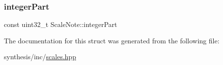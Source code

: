 \mbox{\label{struct_scale_note_aebbc5374b38420c4be5bd2ab0892d2c9}} 
\subsubsection{\texorpdfstring{integer\+Part}{integerPart}}
{\footnotesize\ttfamily const uint32\+\_\+t Scale\+Note\+::integer\+Part}



The documentation for this struct was generated from the following file\+:\begin{DoxyCompactItemize}
\item 
synthesis/inc/\mbox{\hyperlink{scales_8hpp}{scales.\+hpp}}\end{DoxyCompactItemize}
